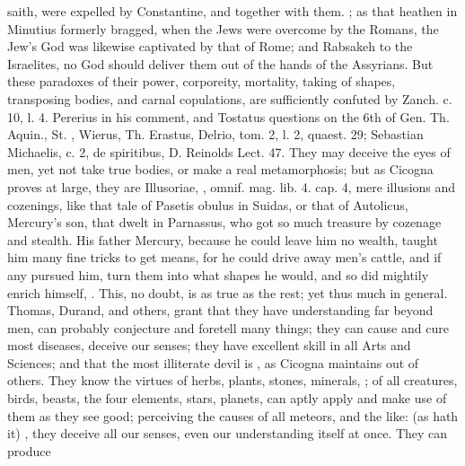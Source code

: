 {{saith, were expelled by Constantine, and together with them. ; as that heathen
in Minutius formerly bragged, when the Jews were overcome by the
Romans, the Jew's God was likewise captivated by that of Rome; and
Rabsakeh to the Israelites, no God should deliver them out of the hands
of the Assyrians. But these paradoxes of their power, corporeity,
mortality, taking of shapes, transposing bodies, and carnal
copulations, are sufficiently confuted by Zanch. c. 10, l. 4. Pererius
in his comment, and Tostatus questions on the 6th of Gen. Th. Aquin.,
St. \Austin{}, Wierus, Th. Erastus, Delrio, tom. 2, l. 2, quaest. 29;
Sebastian Michaelis, c. 2, de spiritibus, D. Reinolds Lect. 47. They
may deceive the eyes of men, yet not take true bodies, or make a real
metamorphosis; but as Cicogna proves at large, they are
Illusoriae, , omnif. mag.
lib. 4. cap. 4, mere illusions and cozenings, like that tale of Pasetis
obulus in Suidas, or that of Autolicus, Mercury's son, that dwelt in
Parnassus, who got so much treasure by cozenage and stealth. His father
Mercury, because he could leave him no wealth, taught him many fine
tricks to get means, for he could drive away men's cattle, and if
any pursued him, turn them into what shapes he would, and so did
mightily enrich himself, . This,
no doubt, is as true as the rest; yet thus much in general. Thomas,
Durand, and others, grant that they have understanding far beyond men,
can probably conjecture and foretell many things; they can cause
and cure most diseases, deceive our senses; they have excellent skill
in all Arts and Sciences; and that the most illiterate devil is , as Cicogna maintains out of others. They know the virtues of herbs, plants, stones, minerals, \etc{}; of all creatures, birds, beasts, the four
elements, stars, planets, can aptly apply and make use of them as they
see good; perceiving the causes of all meteors, and the like:  (as \Austin{} hath it) , they deceive all our
senses, even our understanding itself at once. They can produce
}}
